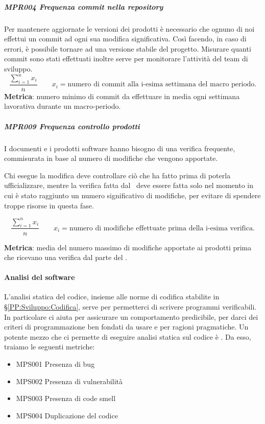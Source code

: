 			\subparagraph{MPR004 Frequenza commit nella repository}
			Per mantenere aggiornate le versioni dei prodotti è necessario che ognuno di noi effettui un commit ad ogni sua modifica significativa.
			Così facendo, in caso di errori, è possibile tornare ad una versione stabile del progetto.
			Misurare quanti commit sono stati effettuati inoltre serve per monitorare l'attività del team di sviluppo.
			\[\dfrac{\sum_{i=1}^{n} x_i}{n} \qquad x_i=\text{numero di commit alla i-esima settimana del macro periodo.}\]
			\textbf{Metrica}: numero minimo di commit da effettuare in media ogni settimana lavorativa durante un macro-periodo.


			\subparagraph{MPR009 Frequenza controllo prodotti}
			I documenti e i prodotti software hanno bisogno di una verifica frequente, commisurata in base al numero di modifiche che vengono apportate.
		
			Chi esegue la modifica deve controllare ciò che ha fatto prima di poterla ufficializzare, mentre la verifica fatta dal \Ver\ deve essere
			fatta solo nel momento in cui è stato raggiunto un numero significativo di modifiche, per evitare di spendere troppe risorse in questa fase.
		
			\[\dfrac{\sum_{i=1}^{n} x_i}{n} \qquad x_i=\text{numero di modifiche effettuate prima della i-esima verifica.}\]
		
			\textbf{Metrica}: media del numero massimo di modifiche apportate ai prodotti prima che ricevano una verifica dal parte del \Ver.


			\paragraph{Analisi del software} \label{analisisw}
			L'analisi statica del codice, insieme alle norme di codifica stabilite in \S\ref{PP:Sviluppo:Codifica}, serve per permetterci di scrivere programmi verificabili.
			In particolare ci aiuta per assicurare un comportamento predicibile, per darci dei criteri di programmazione ben fondati da usare e per ragioni pragmatiche.
			Un potente mezzo che ci permette di eseguire analisi statica sul codice è .
			Da esso, traiamo le seguenti metriche:
			\begin{itemize}%
				\item MPS001 Presenza di bug
				\item MPS002 Presenza di vulnerabilità
				\item MPS003 Presenza di code smell
				\item MPS004 Duplicazione del codice
			\end{itemize}
		
